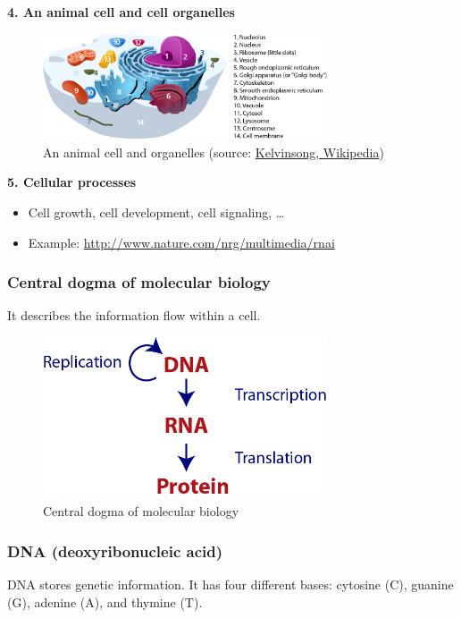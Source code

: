 \noindent \textbf{4. An animal cell and cell organelles}
\begin{figure}[H]
  \centering
      \includegraphics[width=0.75\textwidth]{fig01/animal_cells_and_organelles.png}
  \caption{An animal cell and organelles (source:  \href{https://en.wikipedia.org/wiki/Organelle\#/media/File:Animal_Cell.svg}{Kelvinsong, Wikipedia})}
\end{figure}

\noindent \textbf{5. Cellular processes}
\begin{itemize}
\item Cell growth, cell development, cell signaling, …
\item Example: \url{http://www.nature.com/nrg/multimedia/rnai}
\end{itemize}

%
%
\subsubsection*{Central dogma of molecular biology}

It describes the information flow within a cell.

\begin{figure}[H]
  \centering
      \includegraphics[width=0.75\textwidth]{fig01/central_dogma_of_molecular_biology.png}
  \caption{Central dogma of molecular biology}
\end{figure}

%
%
\subsubsection*{DNA (deoxyribonucleic acid)}
DNA stores genetic information. It has four different bases: cytosine (C), guanine (G), adenine (A), and thymine (T).

